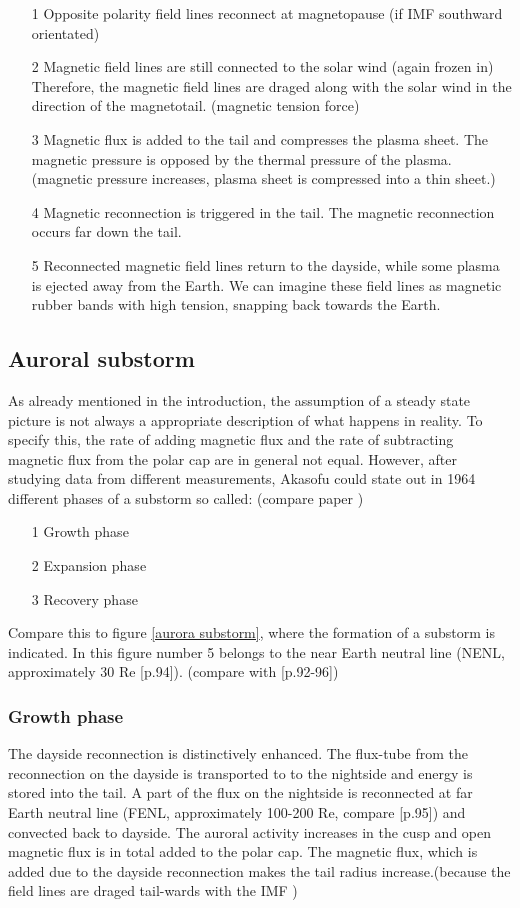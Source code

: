 \documentclass[10pt,a4paper]{article}
\begin{document}
\begin{itemize}
\item[1] Opposite polarity field lines reconnect at magnetopause (if IMF southward orientated)
\item[2] Magnetic field lines are still connected to the solar wind (again frozen in) Therefore, the magnetic field lines are draged along with the solar wind in 
the direction of the magnetotail. (magnetic tension force)
\item[3] Magnetic flux is added to the tail and compresses the plasma sheet. The magnetic pressure is opposed by the thermal pressure of the plasma. 
(magnetic pressure increases, plasma sheet is compressed into a thin sheet.)
\item[4] Magnetic reconnection is triggered in the tail. The magnetic reconnection occurs far down the tail. 
\item[5] Reconnected magnetic field lines return to the dayside, while some plasma is ejected away from the Earth. We can imagine these field lines as magnetic rubber bands with high tension, snapping back towards the Earth.
\end{itemize}

\subsection{Auroral substorm \label{_CHAP_THEO_substorm}}
As already mentioned in the introduction, the assumption of a steady state picture is not always a appropriate description of what happens in reality. To specify this, the rate of adding magnetic flux and the rate of subtracting magnetic flux from the polar cap are in general not equal. However, after studying data from different measurements, Akasofu could state out in 1964 different phases of a substorm so called: (compare paper \cite{paper1})
\begin{itemize}
\item[1] Growth phase
\item[2] Expansion phase
\item[3] Recovery phase
\end{itemize}
Compare this to figure \ref{aurora substorm}, where the formation of a substorm is indicated. In this figure number 5 belongs to the near Earth neutral line (NENL, approximately 30 Re \cite{Buch3}[p.94]). (compare with \cite{Buch3}[p.92-96]) 
\subsubsection{Growth phase}
The dayside reconnection is distinctively enhanced. The flux-tube from the reconnection on the dayside is transported to to the nightside and energy is stored into the tail. A part of the flux on the nightside is reconnected at far Earth neutral line (FENL, approximately 100-200 Re, compare \cite{Buch3}[p.95]) and convected back to dayside. The auroral activity increases in the cusp and open magnetic flux is in total added to the polar cap. The magnetic flux, which is added due to the dayside reconnection makes the tail radius increase.(because the field lines are draged tail-wards with the IMF )
\end{document}

